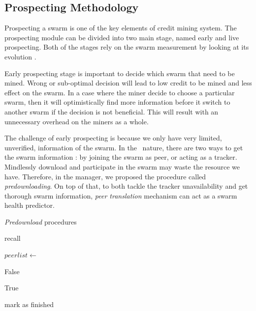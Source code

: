 \subsection{Prospecting Methodology}
\label{section:prospection}
Prospecting a swarm is one of the key elements of credit mining system. The prospecting module can be divided into two main stage, named early and live prospecting. Both of the stages rely on the swarm measurement by looking at its evolution \cite{2013:swarmevolution:su}. 

Early prospecting stage is important to decide which swarm that need to be mined. Wrong or sub-optimal decision will lead to low credit to be mined and less effect on the swarm. In a case where the miner decide to choose a particular swarm, then it will optimistically find more information before it switch to another swarm if the decision is not beneficial. This will result with an unnecessary overhead on the miners as a whole.  

The challenge of early prospecting is because we only have very limited, unverified, information of the swarm. In the \bt~nature, there are two ways to get the swarm information : by joining the swarm as peer, or acting as a tracker. Mindlessly download and participate in the swarm may waste the resource we have. Therefore, in the manager, we proposed the procedure called \textit{predownloading}. On top of that, to both tackle the tracker unavailability and get thorough swarm information, \textit{peer translation} mechanism can act as a swarm health predictor.

\begin{algorithm}[h]
	\caption{\textit{Predownload} procedures}
	\label{alg:predown}
	\begin{algorithmic}[1]
		\State recall 
		\EndIf
		
		\State {}
		
		\State {}
		\State {}
		
		\State {}
		\EndFunction
		\Statex
		\State $peerlist \gets$ 
		\State {}
		
		\State {}
		\State \Return False
		\EndIf
		
		\State {}
		\State {}
		\State \Return True
		\EndIf
		
		\State mark as finished
		\EndIf
		\State {}
		\EndFunction		
	\end{algorithmic}
\end{algorithm}

